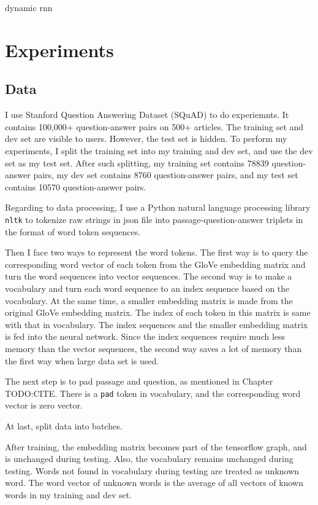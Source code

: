 \documentclass[modernstyle,12pt]{sjsuthesis}
\theoremstyle{definition}
\begin{document}
dynamic rnn
\chapter{Experiments}
\section{Data}
I use Stanford Question Answering Dataset (SQuAD) to do experiemnts.  It contains 100,000+ question-answer pairs on 500+ articles. The training set and dev set are visible to users. However, the test set is hidden. To perform my experiments, I split the training set into my training and dev set, and use the dev set as my test set. After such splitting, my training set contains 78839 question-answer pairs, my dev set contains 8760 question-answer pairs, and my test set contains 10570 question-answer pairs.

 Regarding to data processing, I use a Python natural language processing library {\tt nltk} to tokenize raw strings in json file into passage-question-answer triplets in the format of word token sequences.

Then I face two ways to represent the word tokens. The first way is to query the corresponding word vector of each token from the GloVe embedding matrix and turn the word sequences into vector sequences.  The second way is to make a vocabulary and turn each word sequence to an index sequence based on the vocabulary. At the same time, a smaller embedding matrix is made from the original GloVe embedding matrix. The index of each token in this matrix is same with that in vocabulary. The index sequences and the smaller embedding matrix is fed into the neural network. Since the index sequences require much less memory than the vector sequences, the second way saves a lot of memory than the first way when large data set is used.

The next step is to pad passage and question, as mentioned in Chapter TODO:CITE. There is a {\tt pad} token in vocabulary, and the corresponding word vector is zero vector.

At last, split data into batches.

After training, the embedding matrix becomes part of the tensorflow graph, and is unchanged during testing. Also, the vocabulary remains unchanged during testing. Words not found in vocabulary during testing are treated as unknown word. The word vector of unknown words is the average of all vectors of known words in my training and dev set.
\end{document}
